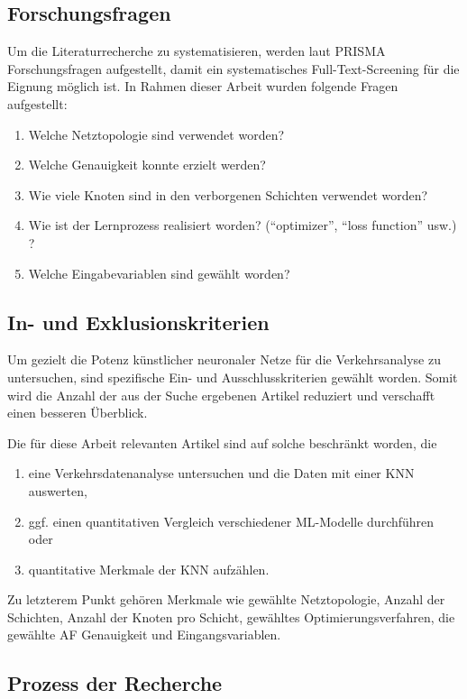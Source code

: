 \documentclass{scrartcl}
\begin{document}
\subsection{Forschungsfragen}

Um die Literaturrecherche zu systematisieren, werden laut PRISMA \cite{prisma}
Forschungsfragen aufgestellt, damit ein systematisches Full-Text-Screening für
die Eignung möglich ist. In Rahmen dieser Arbeit wurden folgende Fragen aufgestellt:
\begin{enumerate}
   \item{ Welche Netztopologie sind verwendet worden? }
   \item{ Welche Genauigkeit konnte erzielt werden? }
   \item{ Wie viele Knoten sind in den verborgenen Schichten verwendet worden?}
   \item{ Wie ist der Lernprozess realisiert worden? (\enquote{optimizer}, \enquote{loss function} usw.) ?}
   \item{ Welche Eingabevariablen sind gewählt worden?}
\end{enumerate}

\subsection{In- und Exklusionskriterien}
Um gezielt die Potenz künstlicher neuronaler Netze für die Verkehrsanalyse zu
untersuchen, sind spezifische Ein- und Ausschlusskriterien gewählt worden. Somit
wird die Anzahl der aus der Suche ergebenen Artikel reduziert und verschafft
einen besseren Überblick.

Die für diese Arbeit relevanten Artikel sind auf solche beschränkt worden, die
\begin{enumerate}
   \item{eine Verkehrsdatenanalyse untersuchen und die Daten mit einer KNN auswerten,}
   \item{ggf. einen quantitativen Vergleich verschiedener ML-Modelle durchführen oder}
   \item{quantitative Merkmale der KNN aufzählen.}
\end{enumerate}
Zu letzterem Punkt gehören Merkmale wie gewählte Netztopologie, Anzahl der Schichten,
Anzahl der Knoten pro Schicht, gewähltes Optimierungsverfahren, die gewählte
AF Genauigkeit und Eingangsvariablen.

\subsection{Prozess der Recherche}
\end{document}
